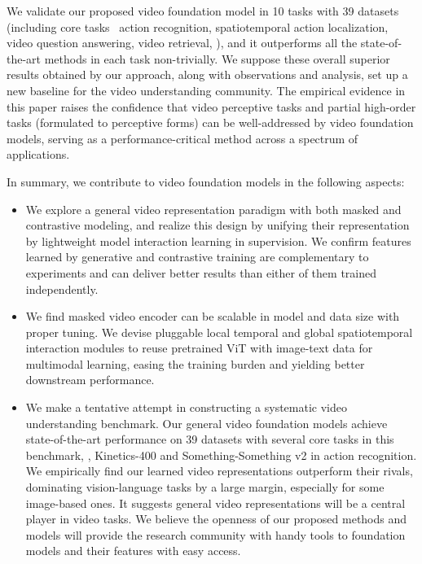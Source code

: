 We validate our proposed video foundation model in 10 tasks with 39 datasets (including core tasks \eg\ action recognition, spatiotemporal action localization, video question answering, video retrieval, \etc), and it outperforms all the state-of-the-art methods in each task non-trivially. We suppose these overall superior results obtained by our approach, along with observations and analysis, set up a new baseline for the video understanding community. The empirical evidence in this paper raises the confidence that video perceptive tasks and partial high-order tasks (formulated to perceptive forms) can be well-addressed by video foundation models, serving as a performance-critical method across a spectrum of applications.

In summary, we contribute to video foundation models in the following aspects:
\begin{itemize}[leftmargin=*]
	\item We explore a general video representation paradigm with both masked and contrastive modeling, and realize this design by unifying their representation by lightweight model interaction learning in supervision. We confirm features learned by generative and contrastive training are complementary to experiments and can deliver better results than either of them trained independently.
	\item We find masked video encoder can be scalable in model and data size with proper tuning. We devise pluggable local temporal and global spatiotemporal interaction modules to reuse pretrained ViT with image-text data for multimodal learning, easing the training burden and yielding better downstream performance.
	\item We make a tentative attempt in constructing a systematic video understanding benchmark. Our general video foundation models achieve state-of-the-art performance on 39 datasets with several core tasks in this benchmark, \eg, Kinetics-400 and Something-Something v2 in action recognition. We empirically find our learned video representations outperform their rivals, dominating vision-language tasks by a large margin, especially for some image-based ones. It suggests general video representations will be a central player in video tasks. We believe the openness of our proposed methods and models will provide the research community with handy tools to foundation models and their features with easy access. 
\end{itemize}
